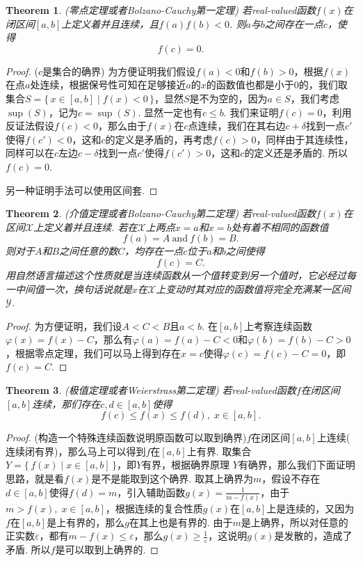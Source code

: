 \documentclass{article}
\newtheorem{theorem}{Theorem}[section]
\newcommand\Set[2]{\{\,#1\mid#2\,\}} %
\begin{document}
\begin{theorem}
\rm {\color{red} (零点定理或者Bolzano-Cauchy第一定理)} 若real-valued函数$f(x)$在闭区间$[a,b]$上定义着并且连续，且$f(a)f(b) < 0$. 则$a$与$b$之间存在一点$c$，使得
$$
f(c) = 0.
$$
\end{theorem}

\begin{proof}
{\color{blue} ($c$是集合的确界) }为方便证明我们假设$f(a) < 0$和$f(b) > 0$，根据$f(x)$在点$a$处连续，根据保号性可知在足够接近$a$的$x$的函数值也都是小于$0$的，我们取集合$S = \Set{x \in [a,b]}{f(x) < 0}$，显然$S$是不为空的，因为$a \in S$，我们考虑$\sup(S)$，记为$c = \sup(S)$. 显然一定也有$c \leq b$. 我们来证明$f(c) = 0$，利用反证法假设$f(c) < 0$，那么由于$f(x)$在$c$点连续，我们在其右边$c+\delta$找到一点$c'$使得$f(c') < 0$，这和$c$的定义是矛盾的，再考虑$f(c) > 0$，同样由于其连续性，同样可以在$c$左边$c-\delta$找到一点$c'$使得$f(c') > 0$，这和$c$的定义还是矛盾的. 所以$f(c) = 0$.

{\color{blue} 另一种证明手法可以使用区间套}.
\end{proof}

\begin{theorem}
\rm {\color{red} (介值定理或者Bolzano-Cauchy第二定理)} 若real-valued函数$f(x)$在区间$\mathcal{X}$上定义着并且连续. 若在$\mathcal{X}$上两点$x=a$和$x=b$处有着不相同的函数值
$$
f(a) = A ~\text{and} ~f(b) = B.
$$
则对于$A$和$B$之间任意的数$C$，均存在一点$c$位于$a$和$b$之间使得
$$
f(c) = C.
$$
用自然语言描述这个性质就是{\color{blue}当连续函数从一个值转变到另一个值时，它必经过每一中间值一次，换句话说就是$x$在$\mathcal{X}$上变动时其对应的函数值将完全充满某一区间$\mathcal{Y}$}.
\end{theorem}

\begin{proof}
为方便证明，我们设$A < C < B$且$a < b$. 在$[a,b]$上考察连续函数$\varphi(x) = f(x) - C$，那么有$\varphi(a) = f(a) - C < 0$和$\varphi(b) = f(b) - C >0$，根据零点定理，我们可以马上得到存在$x=c$使得$\varphi(c) =f(c) - C =0$，即$f(c) = C$.
\end{proof}

\begin{theorem}
\rm {\color{red} (极值定理或者Weierstrass第二定理)} 若real-valued函数$f$在闭区间$[a,b]$连续，那们存在$c,d \in [a,b]$使得
$$
f(c) \leq f(x) \leq f(d),\; x \in [a,b].
$$
\end{theorem}

\begin{proof}
{\color{blue} (构造一个特殊连续函数说明原函数可以取到确界)}$f$在闭区间$[a,b]$上连续({\color{red} 连续闭有界})，那么马上可以得到$f$在$[a,b]$上有界. 取集合$Y = \Set{f(x)}{ x \in [a,b]}$，即$Y$有界，根据{\color{red}确界原理} $Y$有确界，那么我们下面证明思路，就是看$f(x)$是不是能取到这个确界. 取其上确界为$m$，假设不存在$d \in [a,b]$使得$f(d) = m$，引入辅助函数$g(x)=\frac{1}{m - f(x)}$，由于$m > f(x),\; x \in [a,b]$，根据连续的复合性质$g(x)$在$[a,b]$上是连续的，又因为$f$在$[a,b]$是上有界的，那么$g$在其上也是有界的. 由于$m$是上确界，所以对任意的正实数$\varepsilon$，都有$m - f(x) \leq \varepsilon$，那么$g(x) \geq \frac{1}{\varepsilon}$，这说明$g(x)$是发散的，造成了矛盾. 所以$f$是可以取到上确界的.
\end{proof}
\end{document}
